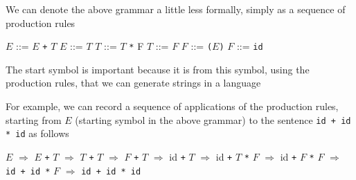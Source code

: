 \documentclass[8pt,a4paper,compress,handout]{beamer}
\newcommand{\mm}[1]{$#1$}
\newenvironment{spaced}
{
\smallskip
\hspace{.5cm}
\begin{minipage}[c]{\textwidth}
}
{
\end{minipage}
\smallskip
}
\begin{document}
\begin{frame}[fragile]
\pause

We can denote the above grammar a little less formally, simply as a sequence of production rules

\text{ }
\begin{spaced}
\begin{production}
\mm{E} ::= \mm{E} \lstinline{+} \mm{T}
\mm{E} ::= \mm{T}
\mm{T} ::= \mm{T}  \lstinline{*} {F}
\mm{T} ::= \mm{F}
\mm{F} ::= \lstinline{(}\mm{E}\lstinline{)}
\mm{F} ::= \lstinline{id}
\end{production}
\end{spaced}

\pause
\bigskip

The start symbol is important because it is from this symbol, using the production rules, that we can generate strings in a language

\pause
\bigskip

For example, we can record a sequence of applications of the production rules, starting from $E$ (starting symbol in the above grammar) to the sentence \lstinline{id + id * id} as follows

\text{ }
\begin{spaced}
\begin{production}
\mm{E} \mm{\Rightarrow} \mm{E} \lstinline{+} \mm{T}
   \mm{\Rightarrow} \mm{T} \lstinline{+} \mm{T}
   \mm{\Rightarrow} \mm{F} \lstinline{+} \mm{T}
   \mm{\Rightarrow} id \lstinline{+} \mm{T}
   \mm{\Rightarrow} id \lstinline{+} \mm{T} \lstinline{*} \mm{F}
   \mm{\Rightarrow} id \lstinline{+} \mm{F} \lstinline{*} \mm{F}
   \mm{\Rightarrow} \lstinline{id + id *} \mm{F}
   \mm{\Rightarrow} \lstinline{id + id * id}
\end{production}
\end{spaced}
\end{frame}
\end{document}
